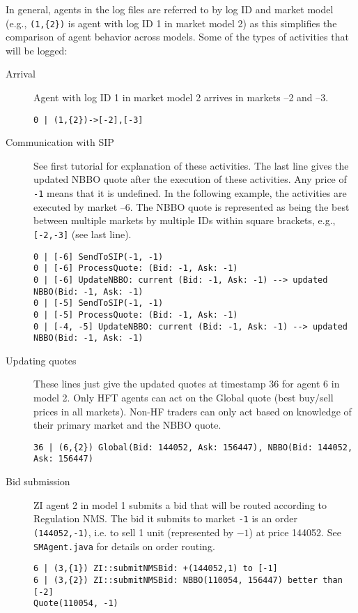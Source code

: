 \documentclass[11pt]{article}
\begin{document}
In general, agents in the log files are referred to by log ID and market model (e.g., \verb|(1,{2})| is agent with log ID 1 in market model 2) as this simplifies the comparison of agent behavior across models.
Some of the types of activities that will be logged:
%
\begin{description}

\item[Arrival] Agent with log ID 1 in market model 2 arrives in markets --2 and --3.
\begin{verbatim}
0 | (1,{2})->[-2],[-3]
\end{verbatim}
\item[Communication with SIP] See first tutorial for explanation of these activities. The last line gives the updated NBBO quote after the execution of these activities. Any price of \verb|-1| means that it is undefined. In the following example, the activities are executed by market --6.
The NBBO quote is represented as being the best between multiple markets by multiple IDs within square brackets, e.g., \verb|[-2,-3]| (see last line).
\begin{verbatim}
0 | [-6] SendToSIP(-1, -1)
0 | [-6] ProcessQuote: (Bid: -1, Ask: -1)
0 | [-6] UpdateNBBO: current (Bid: -1, Ask: -1) --> updated NBBO(Bid: -1, Ask: -1)
0 | [-5] SendToSIP(-1, -1)
0 | [-5] ProcessQuote: (Bid: -1, Ask: -1)
0 | [-4, -5] UpdateNBBO: current (Bid: -1, Ask: -1) --> updated NBBO(Bid: -1, Ask: -1)
\end{verbatim}

\item[Updating quotes] These lines just give the updated quotes at timestamp 36 for agent 6 in model 2. Only HFT agents can act on the Global quote (best buy/sell prices in all markets).
Non-HF traders can only act based on knowledge of their primary market and the NBBO quote.
\begin{verbatim}
36 | (6,{2}) Global(Bid: 144052, Ask: 156447), NBBO(Bid: 144052, Ask: 156447)
\end{verbatim}

\item[Bid submission] ZI agent 2 in model 1 submits a bid that will be routed according to Regulation NMS. The bid it submits to market \verb|-1| is an order \verb|(144052,-1)|, i.e. to sell 1 unit (represented by $-1$) at price 144052.
See \verb|SMAgent.java| for details on order routing.
\begin{verbatim}
6 | (3,{1}) ZI::submitNMSBid: +(144052,1) to [-1]
6 | (3,{2}) ZI::submitNMSBid: NBBO(110054, 156447) better than [-2] 
Quote(110054, -1)
\end{verbatim}


\end{description}
\end{document}
